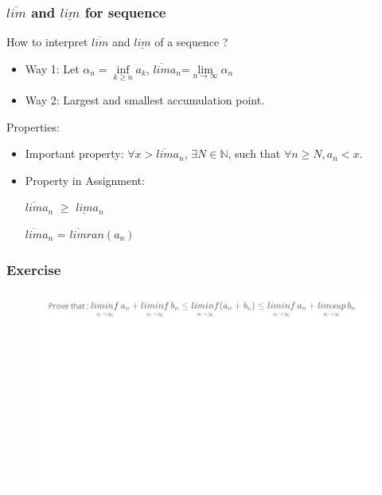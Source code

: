 \documentclass{beamer}
\begin{document}
\begin{frame}
    \frametitle{$\overline{lim}$ and $\underline{lim}$ for sequence }
    How to interpret $\overline{lim}$ and $\underline{lim}$ of a sequence ?
    \begin{itemize}
        \item Way 1: Let $\alpha_{n}=\mathop{inf}\limits_{k\geq n}a_{k}$, $\overline{lim} a_{n}$=$\mathop{lim}\limits_{n\rightarrow \infty}\alpha_{n}$
        \item Way 2: Largest and smallest accumulation point.
    \end{itemize}
    Properties:
    \begin{itemize}
        \item Important property:
              \vspace*{1em}
              $\forall x > \overline{lim} a_{n}$, $\exists N\in \mathbb{N}$, such that $\forall n \geq N, a_{n} < x$.

        \item Property in Assignment:

              \vspace*{1em}
              $\overline{lim}a_{n}$ $\geq$ $\underline{lim}a_{n}$


              \vspace*{1em}
              $\overline{lim} a_{n}$ = $\overline{lim} ran(a_{n})$
    \end{itemize}
\end{frame}

\begin{frame}
    \frametitle{Exercise}
    \begin{figure}[htbp]
        \centering
        \includegraphics[width=12cm]{infsup.png}
    \end{figure}
\end{frame}
\end{document}
